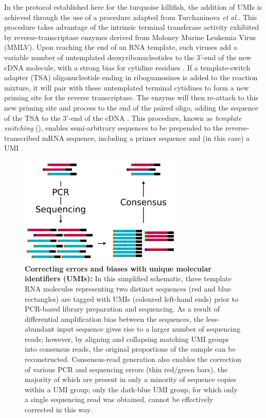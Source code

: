 In the \igseq protocol established here for the turquoise killifish, the addition of UMIs is achieved through the use of a procedure adapted from Turchaninova \textit{et al.}\parencite{turchaninova2016igprep}. This procedure takes advantage of the intrinsic terminal transferase activity exhibited by reverse-transcriptase enzymes derived from Moloney Murine Leukemia Virus (MMLV). Upon reaching the end of an RNA template, such viruses add a variable number of untemplated deoxyribonucleotides to the 3'-end of the new cDNA molecule, with a strong bias for cytidine residues \parencite{zajac2013switching}. If a template-switch adapter (TSA) oligonucleotide ending in riboguanosines is added to the reaction mixture, it will pair with these untemplated terminal cytidines to form a new priming site for the reverse transcriptase. The enzyme will then re-attach to this new priming site and process to the end of the paired oligo, adding the sequence of the TSA to the 3'-end of the cDNA \parencite{zajac2013switching}. This procedure, known as \textit{template switching} (), enables semi-arbitrary sequences to be prepended to the reverse-transcribed mRNA sequence, including a primer sequence and (in this case) a UMI \parencite{turchaninova2016igprep}.

\begin{figure}
\centering
\includegraphics[width=0.7\textwidth]{_Figures/png_edited/umi-consensus-schema}
\caption[Correcting errors and biases with unique molecular identifiers (UMIs)]{\textbf{Correcting errors and biases with unique molecular identifiers (UMIs):} In this simplified schematic, three template RNA molecules representing two distinct sequences (red and blue rectangles) are tagged with UMIs (coloured left-hand ends) prior to PCR-based library preparation and sequencing. As a result of differential amplification bias between the sequences, the less-abundant input sequence gives rise to a larger number of sequencing reads; however, by aligning and collapsing matching UMI groups into consensus reads, the original proportions of the sample can be reconstructed. Consensus-read generation also enables the correction of various PCR and sequencing errors (thin red/green bars), the majority of which are present in only a minority of sequence copies within a UMI group; only the dark-blue UMI group, for which only a single sequencing read was obtained, cannot be effectively corrected in this way.}
\label{fig:umi-consensus-schema}
\end{figure}

